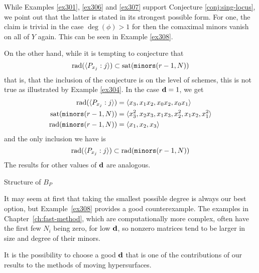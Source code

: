 \documentclass[fleqn,reqno]{amsart}
\numberwithin{first}{chapter}
\begin{document}
\begin{example}[$\mt{ex315}$]
\label{ex315}
While Examples \ref{ex301}, \ref{ex306} and \ref{ex307} support Conjecture \ref{conj:sing-locus},
we point out that the latter is stated in its strongest possible form.
For one, the claim is trivial in the case $\deg(\phi)>1$
for then the comaximal minors vanish on all of $Y$ again.
This can be seen in Example \ref{ex308}.

On the other hand, while it is tempting to conjecture that
\[
	\operatorname{rad}(\langle P_{x_j}:j\rangle)\subset\operatorname{sat}(\mathop{\tt minors}(r-1,N))
\]
that is, that the inclusion of the conjecture is on the level of schemes,
this is not true as illustrated by Example \ref{ex304}.
In the case $\mathbf d=1$, we get
\begin{align*}
	\operatorname{rad}(\langle P_{x_j}:j\rangle)&=\langle {x}_{3},{x}_{1} {x}_{2},{x}_{0} {x}_{2},{x}_{0} {x}_{1}\rangle\\
	\operatorname{sat}(\mathop{\tt minors}(r-1,N))&=\langle{x}_{3}^{2},{x}_{2} {x}_{3},{x}_{1} {x}_{3},{x}_{2}^{2},{x}_{1}
      {x}_{2},{x}_{1}^{2}\rangle\\
	\operatorname{rad}(\mathop{\tt minors}(r-1,N))&=\langle {x}_{1},{x}_{2},{x}_{3}\rangle
\end{align*}
and the only inclusion we have is
\[
	\operatorname{rad}(\langle P_{x_j}:j\rangle)\subset\operatorname{rad}(\mathop{\tt minors}(r-1,N))
\]
The results for other values of $\mathbf d$ are analogous.
\end{example}

\begin{example}[316]
\label{ex316}
Structure of $B_P$
\end{example}

\begin{example}
It may seem at first that taking the smallest possible degree is always our best option,
but Example~\ref{ex308} provides a good counterexample.
The examples in Chapter~\ref{ch:fast-method}, which are computationally more complex,
often have the first few $N_i$ being zero, for low $\mathbf d$,
so nonzero matrices tend to be larger in size and degree of their minors.

It is the possibility to choose a good $\mathbf d$ that is one of the contributions of
our results to the methods of moving hypersurfaces.
\end{example}




\end{document}
